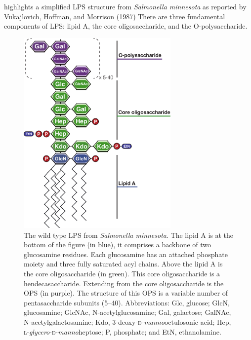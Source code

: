  highlights a simplified \ac{LPS} structure from \textit{Salmonella minnesota} as reported by Vukajlovich, Hoffman, and Morrison
(1987) There are three fundamental components of \ac{LPS}: lipid A, the core oligosaccharide, and the O-polysaccharide.
\begin{figure}[p]
  	\begin{center}
   		\includegraphics[width=0.7\textwidth]{intro/img/lpsoverview.pdf}
   	\end{center}
   	\caption[Simplified structure of \ac{LPS} from \textit{Salmonella minnesota}]{ The wild type \ac{LPS} from \textit{Salmonella minnesota}. The lipid A is at the bottom of the
figure (in blue), it comprises a backbone of two glucosamine residues. Each glucosamine has an attached phosphate moiety and three fully saturated acyl chains. Above the lipid A is
the core oligosaccharide (in green). This core oligosaccharide is a hendecasaccharide. Extending from the core oligosaccharide is the \ac{OPS} (in purple). The structure of this
\ac{OPS} is a variable number of pentasaccharide subunits (5--40). Abbreviations: Glc, glucose; GlcN, glucosamine; GlcNAc, N-acetylglucosamine; Gal, galactose; GalNAc,
N-acetylgalactosamine; Kdo, 3-deoxy-\textsc{d}-\textit{manno}octulosonic acid; Hep, \textsc{l}-\textit{glycero}-\textsc{d}-\textit{manno}heptose; P, phosphate; and EtN,
ethanolamine. }
   	\label{fig:lpsoverview}
\end{figure}

